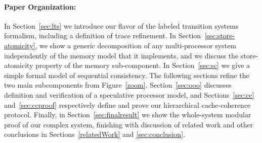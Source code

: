 \paragraph{Paper Organization:} In Section~\ref{sec:lts} we introduce our
flavor of the labeled transition systems formalism, including a definition of
trace refinement. In Section~\ref{sec:store-atomicity}, we show a generic
decomposition of any multi-processor system independently of the memory model
that it implements, and we discuss the store-atomicity property of the memory
sub-component. In Section~\ref{sec:sc} we
give a simple formal model of sequential consistency.  The
following sections refine the two main subcomponents from Figure~\ref{zoom}.
Section~\ref{sec:ooo} discusses definition and verification of a speculative
processor model, and Sections~\ref{sec:cc} and~\ref{sec:ccproof} respectively
define and prove our hierarchical cache-coherence protocol.  Finally, in
Section~\ref{sec:finalresult} we show the whole-system modular proof of our
complex system, finishing with discussion of related work and other conclusions in
Sections~\ref{relatedWork} and \ref{sec:conclusion}.




